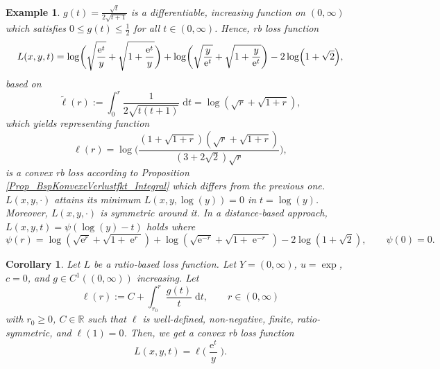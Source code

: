 \documentclass[10pt]{article}
\newcommand{\R}{\mathbb{R}}
\DeclareMathOperator{\e}{e}
\newcommand{\dd}{\mathrm{d}}
\newtheorem{example}[theorem]{Example}
\newtheorem{corollary}[theorem]{Corollary}
\begin{document}
\begin{example} \label{bsp_konvex_Lipschitz_3}
	$g(t) = \frac{\sqrt{t}}{2\sqrt{t+1}}$ is a differentiable, increasing function on $(0, \infty)$ which satisfies $0 \leq g(t) \leq \frac{1}{2}$ for all $t \in (0, \infty)$.
	Hence, rb loss function
	\begin{equation*}
		L(x,y,t) = \log \biggl(\sqrt{\frac{\e^t}{y}} + \sqrt{1+\frac{\e^t}{y}}\biggr) + \log\biggl(\sqrt{\frac{y}{\e^t}} + \sqrt{1+\frac{y}{\e^t}}\biggr) - 2 \log\Bigl(1 + \sqrt{2}\Bigr),
	\end{equation*}
	based on 
	\begin{equation*}
		\widetilde{\ell}(r) := \int_{0}^{r} \frac{1}{2\sqrt{t(t+1)}} \; \mathrm{d}t = \log(\sqrt{r} + \sqrt{1+r}),
	\end{equation*}
	which yields representing function
	\begin{equation}\label{bsp_3_Loss}
		\ell(r) = \log\biggl(\frac{(1+\sqrt{1+r})(\sqrt{r}+\sqrt{1+r})}{(3+2\sqrt{2})\sqrt{r}}\biggr),
	\end{equation}
	is a convex rb loss according to Proposition \ref{Prop_BspKonvexeVerlustfkt_Integral} which differs from the previous one.
	$L(x,y,\cdot)$ attains its minimum $L(x,y,\log(y))=0$ in $t = \log(y)$.
	Moreover, $L(x,y,\cdot)$ is symmetric around it.
	In a distance-based approach, $L(x,y,t) = \psi(\log(y)-t)$ holds where
	\begin{equation*}
		\psi(r) = \log(\sqrt{\e^r}+\sqrt{1+\e^r}) + \log(\sqrt{\e^{-r}}+\sqrt{1+\e^{-r}}) - 2\log(1+\sqrt{2}), \qquad \psi(0) = 0.
	\end{equation*}
\end{example}
\begin{corollary}
	Let $L$ be a ratio-based loss function.
	Let $Y = (0, \infty)$, $u = \exp$, $c = 0$, and $g \in C^1((0, \infty))$ increasing.
	Let 
	\begin{equation*}
		\ell(r) := C + \int_{r_0}^r \frac{g(t)}{t} \; \dd t, \qquad r \in (0, \infty)
	\end{equation*}
	with $r_0 \geq 0$, $C \in \R$ such that $\ell$ is well-defined, non-negative, finite, ratio-symmetric, and $\ell(1) = 0$.
	Then, we get a convex rb loss function
	\begin{equation*}
		L(x,y,t) = \ell\biggl(\frac{\e^t}{y}\biggr) .
	\end{equation*}
\end{corollary}
\end{document}
